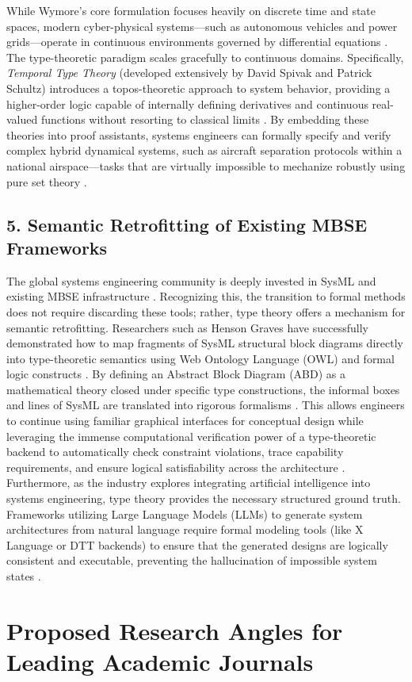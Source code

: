 \documentclass[11pt]{article}
\begin{document}
While Wymore's core formulation focuses heavily on discrete time and state spaces, modern cyber-physical systems---such as autonomous vehicles and power grids---operate in continuous environments governed by differential equations \parencite{Ref50, Ref51, Ref52}. The type-theoretic paradigm scales gracefully to continuous domains. Specifically, \textit{Temporal Type Theory} (developed extensively by David Spivak and Patrick Schultz) introduces a topos-theoretic approach to system behavior, providing a higher-order logic capable of internally defining derivatives and continuous real-valued functions without resorting to classical limits \parencite{Ref53, Ref54, Ref55, Ref56}. By embedding these theories into proof assistants, systems engineers can formally specify and verify complex hybrid dynamical systems, such as aircraft separation protocols within a national airspace---tasks that are virtually impossible to mechanize robustly using pure set theory \parencite{Ref55, Ref57}.\subsection{5. Semantic Retrofitting of Existing MBSE Frameworks}
The global systems engineering community is deeply invested in SysML and existing MBSE infrastructure \parencite{Ref5, Ref42, Ref58}. Recognizing this, the transition to formal methods does not require discarding these tools; rather, type theory offers a mechanism for semantic retrofitting. Researchers such as Henson Graves have successfully demonstrated how to map fragments of SysML structural block diagrams directly into type-theoretic semantics using Web Ontology Language (OWL) and formal logic constructs \parencite{Ref4, Ref59}. By defining an Abstract Block Diagram (ABD) as a mathematical theory closed under specific type constructions, the informal boxes and lines of SysML are translated into rigorous formalisms \parencite{Ref4, Ref60}. This allows engineers to continue using familiar graphical interfaces for conceptual design while leveraging the immense computational verification power of a type-theoretic backend to automatically check constraint violations, trace capability requirements, and ensure logical satisfiability across the architecture \parencite{Ref60, Ref61, Ref62}. Furthermore, as the industry explores integrating artificial intelligence into systems engineering, type theory provides the necessary structured ground truth. Frameworks utilizing Large Language Models (LLMs) to generate system architectures from natural language require formal modeling tools (like X Language or DTT backends) to ensure that the generated designs are logically consistent and executable, preventing the hallucination of impossible system states \parencite{Ref63, Ref64, Ref65}.\section{Proposed Research Angles for Leading Academic Journals}
\end{document}
